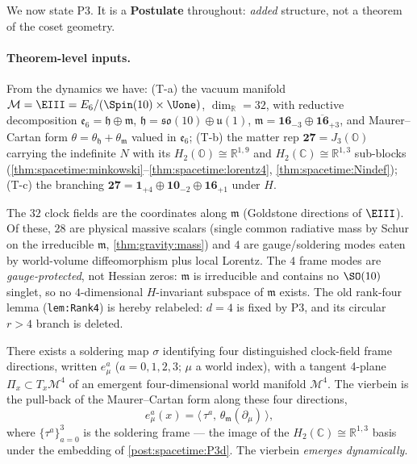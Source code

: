 We now state P3. It is a \textbf{Postulate} throughout: \emph{added} structure, not a
theorem of the coset geometry.

\paragraph{Theorem-level inputs.}
From the dynamics we have: (T-a) the vacuum manifold
$\mathcal M=\EIII=E_6/(\Spin(10)\times\Uone)$, $\dim_{\mathbb R}=32$, with reductive
decomposition $\mathfrak e_6=\mathfrak h\oplus\mathfrak m$,
$\mathfrak h=\mathfrak{so}(10)\oplus\mathfrak u(1)$,
$\mathfrak m=\mathbf{16}_{-3}\oplus\overline{\mathbf{16}}_{+3}$, and Maurer--Cartan
form $\theta=\theta_{\mathfrak h}+\theta_{\mathfrak m}$ valued in $\mathfrak e_6$;
(T-b) the matter rep $\mathbf{27}=J_3(\mathbb O)$ carrying the indefinite $N$ with its
$H_2(\mathbb O)\cong\mathbb R^{1,9}$ and $H_2(\mathbb C)\cong\mathbb R^{1,3}$ sub-blocks
(\autoref{thm:spacetime:minkowski}--\autoref{thm:spacetime:lorentz4},
\autoref{thm:spacetime:Nindef}); (T-c) the branching
$\mathbf{27}=\mathbf 1_{+4}\oplus\mathbf{10}_{-2}\oplus\mathbf{16}_{+1}$ under $H$.

The $32$ clock fields are the coordinates along $\mathfrak m$ (Goldstone directions of
$\EIII$). Of these, $28$ are physical massive scalars (single common radiative mass by
Schur on the irreducible $\mathfrak m$, \autoref{thm:gravity:mass}) and $4$ are
gauge/soldering modes eaten by world-volume diffeomorphism plus local Lorentz. The $4$
frame modes are \emph{gauge-protected}, not Hessian zeros: $\mathfrak m$ is
irreducible and contains no $\SO(10)$ singlet, so no $4$-dimensional $H$-invariant
subspace of $\mathfrak m$ exists. The old rank-four lemma (\texttt{lem:Rank4}) is
hereby relabeled: $d=4$ is fixed by P3, and its circular $r>4$ branch is deleted.

\begin{postulate}\label{post:spacetime:P3a}
There exists a soldering map $\sigma$ identifying four distinguished clock-field frame
directions, written $e^a_\mu$ ($a=0,1,2,3$; $\mu$ a world index), with a tangent
4-plane $\Pi_x\subset T_x\mathcal M^4$ of an emergent four-dimensional world manifold
$\mathcal M^4$. The vierbein is the pull-back of the Maurer--Cartan form along these
four directions,
\begin{equation}\label{eq:spacetime:vierbein}
  e^a_\mu(x)=\bigl\langle\,\tau^a,\,\theta_{\mathfrak m}(\partial_\mu)\,\bigr\rangle,
\end{equation}
where $\{\tau^a\}_{a=0}^{3}$ is the soldering frame --- the image of the
$H_2(\mathbb C)\cong\mathbb R^{1,3}$ basis under the embedding of
\autoref{post:spacetime:P3d}. The vierbein \emph{emerges dynamically}.
\end{postulate}

